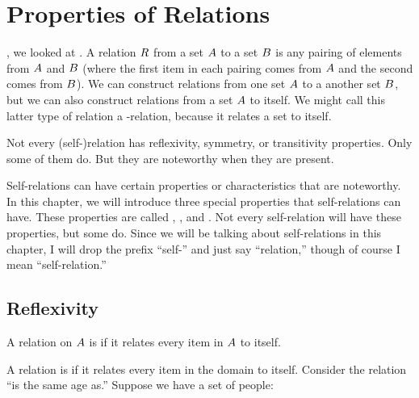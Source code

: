 \documentclass[../../../main.tex]{subfiles}
\begin{document}
\chapter{Properties of Relations}
\label{ch:properties-of-relations}

, we looked at . A relation $R$ from a set $A$ to a set $B$ is any pairing of elements from $A$ and $B$ (where the first item in each pairing comes from $A$ and the second comes from $B$). We can construct relations from one set $A$ to a another set $B$, but we can also construct relations from a set $A$ to itself. We might call this latter type of relation a -relation, because it relates a set to itself. 

\begin{aside}
  \begin{remark}
    Not every (self-)relation has reflexivity, symmetry, or transitivity properties. Only some of them do. But they are noteworthy when they are present.
  \end{remark}
\end{aside}

Self-relations can have certain properties or characteristics that are noteworthy. In this chapter, we will introduce three special properties that self-relations can have. These properties are called , , and . Not every self-relation will have these properties, but some do. Since we will be talking about self-relations in this chapter, I will drop the prefix ``self-'' and just say ``relation,'' though of course I mean ``self-relation.''


\section{Reflexivity}

\begin{terminology}
  A relation on $A$ is  if it relates every item in $A$ to itself.
\end{terminology}

A relation is  if it relates every item in the domain to itself. Consider the relation ``is the same age as.'' Suppose we have a set of people:
\end{document}
